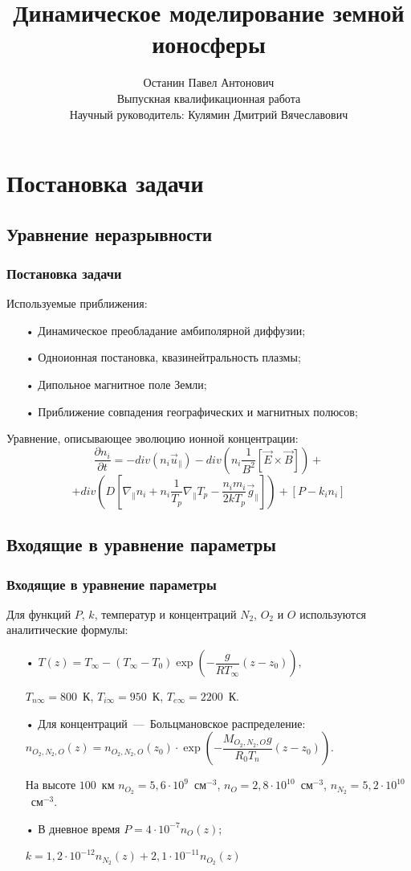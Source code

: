 \documentclass[9pt, apectratio=43,unicode]{beamer}
\title[Моделирование земной ионосферы]{Динамическое моделирование земной ионосферы}
\author[Останин П. А.]{Останин Павел Антонович \\ \vspace{1ex} Выпускная квалификационная работа\\ \vspace{1ex} Научный руководитель: Кулямин Дмитрий Вячеславович}
\date{}
\begin{document}
\begin{frame}[plain]
\titlepage
\end{frame}

\def\L{\mathcal{L}}

\section{Постановка задачи}
\subsection{Уравнение неразрывности}
\begin{frame}\frametitle{Постановка задачи}


Используемые приближения:
\begin{itemize}
\item[•] Динамическое преобладание амбиполярной диффузии;
\item[•] Одноионная постановка, квазинейтральность плазмы;
\item[•] Дипольное магнитное поле Земли;
\item[•] Приближение совпадения географических и магнитных полюсов;
\end{itemize}

Уравнение, описывающее эволюцию ионной концентрации: $$\dfrac{\partial n_i}{\partial t} = -div(n_i \vec{u}_\parallel)-div\left(n_i\dfrac{1}{B^2}[\vec{E}\times \vec{B}] \right)+$$ $$+div\left(D\left[\nabla_\parallel n_i +n_i\dfrac{1}{T_p}\nabla_\parallel T_p - \dfrac{n_i m_i}{2kT_p}\vec{g}_\parallel\right]\right)+[P-k_in_i]$$

\end{frame}


\subsection{Входящие в уравнение параметры}
\begin{frame}\frametitle{Входящие в уравнение параметры}
Для функций $P$, $k$, температур и концентраций $N_2$, $O_2$ и $O$ используются аналитические формулы: 
\begin{itemize}
\item[•] $T(z)=T_\infty - (T_\infty-T_0)\exp\left(-\dfrac{g}{RT_\infty}(z-z_0)\right),$ 

$T_{n\infty}=800$~К, $T_{i\infty}=950$~К, $T_{e\infty}=2200$~К.

\smallskip

\item[•] Для концентраций~---~Больцмановское распределение: $n_{O_2, N_2, O} (z)= n_{O_2, N_2, O} (z_0)\cdot \exp\left(-\dfrac{M_{O_2, N_2, O}g}{R_0T_n}(z-z_0)\right).$ 

На высоте $100$~км $n_{O_2} = 5{,}6\cdot 10^9$~см$^{-3}$, $n_{O} = 2{,}8\cdot 10^{10}$~см$^{-3}$, $n_{N_2} = 5{,}2\cdot 10^{10}$~см$^{-3}$.

\smallskip


\item[•] В дневное время $P=4\cdot10^{-7}n_O(z)$;

$k=1{,}2\cdot10^{-12}n_{N_2}(z)+2{,}1\cdot10^{-11}n_{O_2}(z)$
\end{itemize}
\end{frame}
\end{document}
